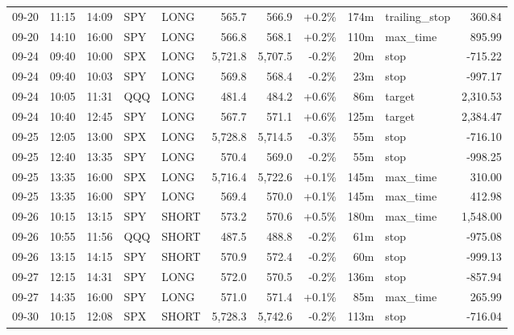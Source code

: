 \documentclass[11pt,a4paper,twoside]{article}
\begin{document}
\begin{center}
\begin{longtable}{>{\color{txtmain}}l l l l l r r r r >{\color{txtmain}}l r}
09-20 & 11:15 & 14:09 & SPY & LONG & 565.7 & 566.9 & \textcolor{wingreen}{+0.2\%} & 174m & trailing\_stop & \textcolor{wingreen}{360.84} \\
09-20 & 14:10 & 16:00 & SPY & LONG & 566.8 & 568.1 & \textcolor{wingreen}{+0.2\%} & 110m & max\_time & \textcolor{wingreen}{895.99} \\
09-24 & 09:40 & 10:00 & SPX & LONG & 5,721.8 & 5,707.5 & \textcolor{lossred}{-0.2\%} & 20m & stop & \textcolor{lossred}{-715.22} \\
09-24 & 09:40 & 10:03 & SPY & LONG & 569.8 & 568.4 & \textcolor{lossred}{-0.2\%} & 23m & stop & \textcolor{lossred}{-997.17} \\
09-24 & 10:05 & 11:31 & QQQ & LONG & 481.4 & 484.2 & \textcolor{wingreen}{+0.6\%} & 86m & target & \textcolor{wingreen}{2,310.53} \\
09-24 & 10:40 & 12:45 & SPY & LONG & 567.7 & 571.1 & \textcolor{wingreen}{+0.6\%} & 125m & target & \textcolor{wingreen}{2,384.47} \\
09-25 & 12:05 & 13:00 & SPX & LONG & 5,728.8 & 5,714.5 & \textcolor{lossred}{-0.3\%} & 55m & stop & \textcolor{lossred}{-716.10} \\
09-25 & 12:40 & 13:35 & SPY & LONG & 570.4 & 569.0 & \textcolor{lossred}{-0.2\%} & 55m & stop & \textcolor{lossred}{-998.25} \\
09-25 & 13:35 & 16:00 & SPX & LONG & 5,716.4 & 5,722.6 & \textcolor{wingreen}{+0.1\%} & 145m & max\_time & \textcolor{wingreen}{310.00} \\
09-25 & 13:35 & 16:00 & SPY & LONG & 569.4 & 570.0 & \textcolor{wingreen}{+0.1\%} & 145m & max\_time & \textcolor{wingreen}{412.98} \\
09-26 & 10:15 & 13:15 & SPY & SHORT & 573.2 & 570.6 & \textcolor{wingreen}{+0.5\%} & 180m & max\_time & \textcolor{wingreen}{1,548.00} \\
09-26 & 10:55 & 11:56 & QQQ & SHORT & 487.5 & 488.8 & \textcolor{lossred}{-0.2\%} & 61m & stop & \textcolor{lossred}{-975.08} \\
09-26 & 13:15 & 14:15 & SPY & SHORT & 570.9 & 572.4 & \textcolor{lossred}{-0.2\%} & 60m & stop & \textcolor{lossred}{-999.13} \\
09-27 & 12:15 & 14:31 & SPY & LONG & 572.0 & 570.5 & \textcolor{lossred}{-0.2\%} & 136m & stop & \textcolor{lossred}{-857.94} \\
09-27 & 14:35 & 16:00 & SPY & LONG & 571.0 & 571.4 & \textcolor{wingreen}{+0.1\%} & 85m & max\_time & \textcolor{wingreen}{265.99} \\
09-30 & 10:15 & 12:08 & SPX & SHORT & 5,728.3 & 5,742.6 & \textcolor{lossred}{-0.2\%} & 113m & stop & \textcolor{lossred}{-716.04} \\

\end{longtable}
\end{center}
\end{document}
